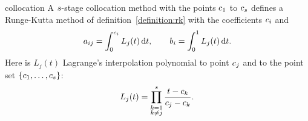 \begin{Lemma}{collocation}
  A $s$-stage collocation method with the points $c_1$
  to $c_s$ defines a Runge-Kutta method of
  definition~\ref{definition:rk} with the coefficients $c_i$ and
  \begin{gather}
  \label{eq:implicit:kolkoef}
    a_{ij} =  \int_0^{c_i} L_j(t)\, \mathrm{d} t,
    \qquad
    b_i =\int_0^1 L_j(t)\, \mathrm{d} t.
  \end{gather}
  Here is $L_j(t)$ Lagrange's interpolation polynomial to point $c_j$
  and to the point set $\{c_1,\dots,c_s\}$:
  \begin{gather*}
    L_j(t) = \prod_{\substack{k=1\\k\neq j}}^s \frac{t-c_k}{c_j-c_k}.
  \end{gather*}
\end{Lemma}

